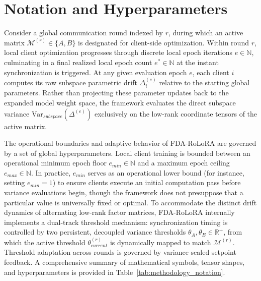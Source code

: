 \clearpage
\section{Notation and Hyperparameters}\label{sec:notation_hyperparams}
Consider a global communication round indexed by $r$, during which an active matrix $\mathcal{M}^{(r)} \in \{A, B\}$ is designated for client-side optimization. Within round $r$, local client optimization progresses through discrete local epoch iterations $e \in \mathbb{N}$, culminating in a final realized local epoch count $e^* \in \mathbb{N}$ at the instant synchronization is triggered. At any given evaluation epoch $e$, each client $i$ computes its raw subspace parametric drift $\Delta_i^{(e)}$ relative to the starting global parameters. Rather than projecting these parameter updates back to the expanded model weight space, the framework evaluates the direct subspace variance $\text{Var}_{subspace}(\Delta^{(e)})$ exclusively on the low-rank coordinate tensors of the active matrix.

The operational boundaries and adaptive behavior of FDA-RoLoRA are governed by a set of global hyperparameters. Local client training is bounded between an operational minimum epoch floor $e_{min} \in \mathbb{N}$ and a maximum epoch ceiling $e_{max} \in \mathbb{N}$. In practice, $e_{min}$ serves as an operational lower bound (for instance, setting $e_{min} = 1$) to ensure clients execute an initial computation pass before variance evaluations begin, though the framework does not presuppose that a particular value is universally fixed or optimal. To accommodate the distinct drift dynamics of alternating low-rank factor matrices, FDA-RoLoRA internally implements a dual-track threshold mechanism: synchronization timing is controlled by two persistent, decoupled variance thresholds $\theta_A, \theta_B \in \mathbb{R}^+$, from which the active threshold $\theta_{current}^{(r)}$ is dynamically mapped to match $\mathcal{M}^{(r)}$. Threshold adaptation across rounds is governed by variance-scaled setpoint feedback. A comprehensive summary of mathematical symbols, tensor shapes, and hyperparameters is provided in Table~\ref{tab:methodology_notation}.

